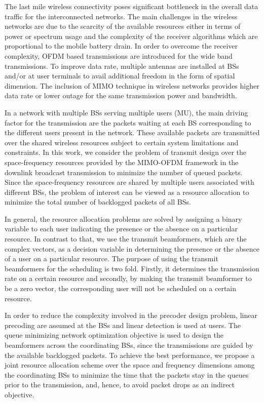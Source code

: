 
The last mile wireless connectivity poses significant bottleneck in the overall data traffic for the interconnected networks. The main challenges in the wireless networks are due to the scarcity of the available resources either in terms of power or spectrum usage and the complexity of the receiver algorithms which are proportional to the mobile battery drain. In order to overcome the receiver complexity, \ac{OFDM} based transmissions are introduced for the wide band transmissions. To improve data rate, multiple antennas are installed at \acp{BS} and/or at user terminals to avail additional freedom in the form of spatial dimension. The inclusion of \ac{MIMO} technique in wireless networks provides higher data rate or lower outage for the same transmission power and bandwidth.

In a network with multiple \acp{BS} serving multiple users (\acs{MU}), the main driving factor for the transmission are the packets waiting at each \ac{BS} corresponding to the different users present in the network. These available packets are transmitted over the shared wireless resources subject to certain system limitations and constraints. In this work, we consider the problem of transmit design over the space-frequency resources provided by the \acs{MIMO}-\ac{OFDM} framework in the downlink broadcast transmission to minimize the number of queued packets. Since the space-frequency resources are shared by multiple users associated with different \acp{BS}, the problem of interest can be viewed as a resource allocation to minimize the total number of backlogged packets of all \acp{BS}.

In general, the resource allocation problems are solved by assigning a binary variable to each user indicating the presence or the absence on a particular resource. In contrast to that, we use the transmit beamformers, which are the complex vectors, as a decision variable in determining the presence or the absence of a user on a particular resource. The purpose of using the transmit beamformers for the scheduling is two fold. Firstly, it determines the transmission rate on a certain resource and secondly, by making the transmit beamformer to be a zero vector, the corresponding user will not be scheduled on a certain resource.

In order to reduce the complexity involved in the precoder design problem, linear precoding are assumed at the \acp{BS} and linear detection is used at users. The queue minimizing network optimization objective is used to design the beamformers across the coordinating \acp{BS}, since the transmissions are guided by the available backlogged packets. To achieve the best performance, we propose a joint resource allocation scheme over the space and frequency dimensions among the coordinating \acp{BS} to minimize the time that the packets stay in the queues prior to the transmission, and, hence, to avoid packet drops as an indirect objective.

